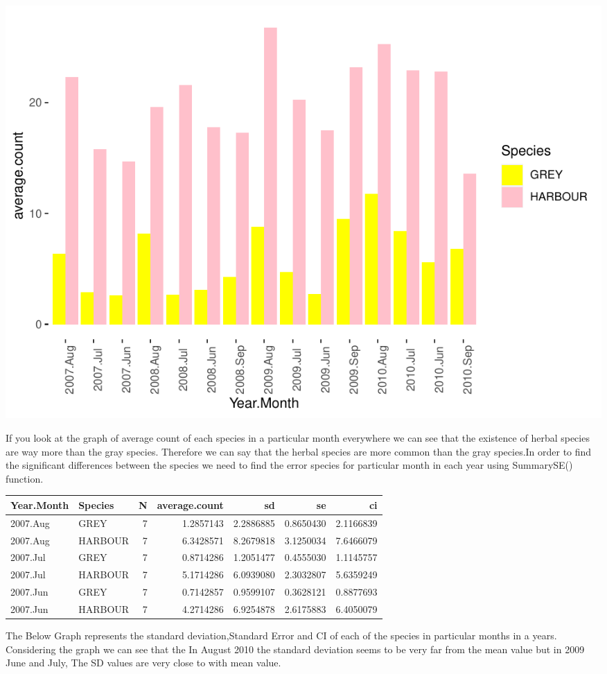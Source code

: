 \documentclass[
]{article}
\begin{document}
\includegraphics{Statistical-analysis-in-RStudio_files/figure-latex/unnamed-chunk-31-1.pdf}

If you look at the graph of average count of each species in a
particular month everywhere we can see that the existence of herbal
species are way more than the gray species. Therefore we can say that
the herbal species are more common than the gray species.In order to
find the significant differences between the species we need to find the
error species for particular month in each year using SummarySE()
function.

\begin{longtable}[]{@{}llrrrrr@{}}
\toprule
Year.Month & Species & N & average.count & sd & se & ci\tabularnewline
\midrule
\endhead
2007.Aug & GREY & 7 & 1.2857143 & 2.2886885 & 0.8650430 &
2.1166839\tabularnewline
2007.Aug & HARBOUR & 7 & 6.3428571 & 8.2679818 & 3.1250034 &
7.6466079\tabularnewline
2007.Jul & GREY & 7 & 0.8714286 & 1.2051477 & 0.4555030 &
1.1145757\tabularnewline
2007.Jul & HARBOUR & 7 & 5.1714286 & 6.0939080 & 2.3032807 &
5.6359249\tabularnewline
2007.Jun & GREY & 7 & 0.7142857 & 0.9599107 & 0.3628121 &
0.8877693\tabularnewline
2007.Jun & HARBOUR & 7 & 4.2714286 & 6.9254878 & 2.6175883 &
6.4050079\tabularnewline
\bottomrule
\end{longtable}

The Below Graph represents the standard deviation,Standard Error and CI
of each of the species in particular months in a years. Considering the
graph we can see that the In August 2010 the standard deviation seems to
be very far from the mean value but in 2009 June and July, The SD values
are very close to with mean value.
\end{document}
